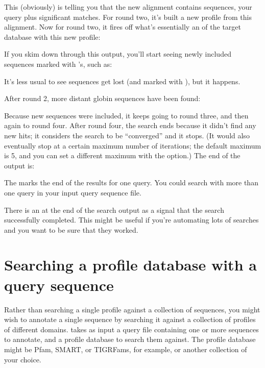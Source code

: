 
This (obviously) is telling you that the new alignment contains \JHUninc{}
sequences, your query plus \JHUnsig{} significant matches. For round two,
it's built a new profile from this alignment. Now for round two, it
fires off what's essentially an  of the target
database with this new profile:


If you skim down through this output, you'll start seeing newly
included sequences marked with \mono{+}'s, such as:


It's less usual to see sequences get lost (and marked with \mono{-}),
but it happens.

After round 2, more distant globin sequences have been found:


Because new sequences were included, it keeps going to round three,
and then again to round four. After round four, the search ends
because it didn't find any new hits; it considers the search to be
``converged'' and it stops. (It would also eventually stop at a
certain maximum number of iterations; the default maximum is 5, and
you can set a different maximum with the  option.)  The end
of the output is:


The \mono{//} marks the end of the results for one query. You could
search with more than one query in your input query sequence
file. 

There is an \mono{[ok]} at the end of the search output as a signal
that the search successfully completed. This might be useful if you're
automating lots of searches and you want to be sure that they worked.



\section{Searching a profile database with a query sequence}

Rather than searching a single profile against a collection of
sequences, you might wish to annotate a single sequence by
searching it against a collection of profiles of different domains.
 takes as input a query file containing one or more
sequences to annotate, and a profile database to search them against.
The profile database might be Pfam, SMART, or TIGRFams, for example, or
another collection of your choice. 

